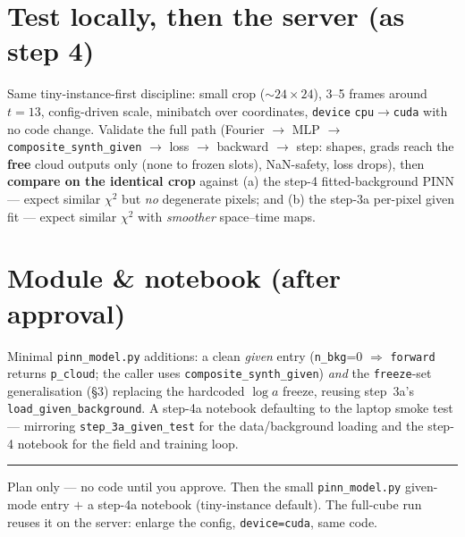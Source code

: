 \documentclass[10pt,a4paper]{article}
\newcommand{\co}[1]{{\small\texttt{#1}}}
\begin{document}
\section{Test locally, then the server (as step 4)}

Same tiny-instance-first discipline: small crop ($\sim\!24\times24$), 3--5 frames around $t\!=\!13$, config-driven scale, minibatch over coordinates, \co{device} \co{cpu}$\to$\co{cuda} with no code change. Validate the full path (Fourier $\to$ MLP $\to$ \co{composite\_synth\_given} $\to$ loss $\to$ backward $\to$ step: shapes, grads reach the \textbf{free} cloud outputs only (none to frozen slots), NaN-safety, loss drops), then \textbf{compare on the identical crop} against (a) the step-4 fitted-background PINN --- expect similar $\chi^2$ but \emph{no} degenerate pixels; and (b) the step-3a per-pixel given fit --- expect similar $\chi^2$ with \emph{smoother} space--time maps.

\section{Module \& notebook (after approval)}

Minimal \co{pinn\_model.py} additions: a clean \emph{given} entry (\co{n\_bkg}=0 $\Rightarrow$ \co{forward} returns \co{p\_cloud}; the caller uses \co{composite\_synth\_given}) \emph{and} the \co{freeze}-set generalisation (\S3) replacing the hardcoded $\log a$ freeze, reusing step~3a's \co{load\_given\_background}. A step-4a notebook defaulting to the laptop smoke test --- mirroring \co{step\_3a\_given\_test} for the data/background loading and the step-4 notebook for the field and training loop.

\vspace{1pt}
{\footnotesize\color{gry}\rule{\textwidth}{0.4pt}}
{\sffamily\color{gry}\footnotesize Plan only --- no code until you approve. Then the small \co{pinn\_model.py} given-mode entry $+$ a step-4a notebook (tiny-instance default). The full-cube run reuses it on the server: enlarge the config, \co{device=cuda}, same code.}
\end{document}
